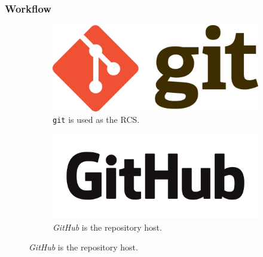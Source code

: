 \documentclass{beamer}
\begin{document}
\begin{frame}
  \frametitle{Workflow}
  \begin{figure}[h!]
    \centering
    \begin{subfigure}[b]{0.3\linewidth}
      \includegraphics[width=\linewidth]{Git-Logo-2Color.png}
      \caption{\texttt{git} is used as the RCS.}
      \label{fig:git3a}
    \end{subfigure}
    \hspace{0.1\linewidth}
    \begin{subfigure}[b]{0.3\linewidth}
      \includegraphics[width=\linewidth]{GitHub_Logo.png}
      \caption{\textit{GitHub} is the repository host.}
      \label{fig:git3b}
    \end{subfigure}
    \label{fig:git3}
  \end{figure}
\end{frame}
\end{document}
